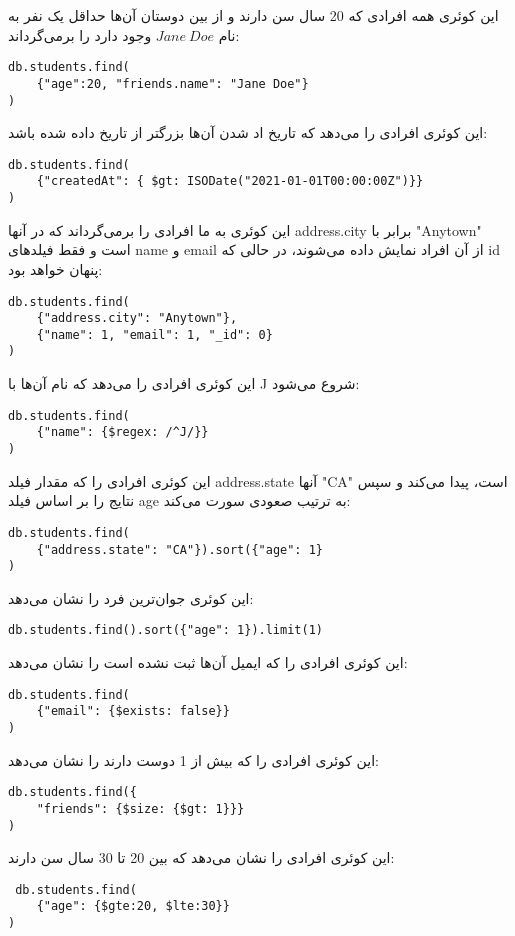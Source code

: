 این کوئری همه افرادی که 20 سال سن دارند و از بین دوستان آن‌ها حداقل یک نفر به نام $Jane \ Doe$ وجود دارد را برمی‌گرداند:
\setLTR
\begin{lstlisting}
db.students.find(
	{"age":20, "friends.name": "Jane Doe"}
)
\end{lstlisting}
\setRTL


این کوئری افرادی را می‌دهد که تاریخ اد شدن آن‌ها بزرگتر از تاریخ داده شده باشد:
\setLTR
\begin{lstlisting}
db.students.find(
	{"createdAt": { $gt: ISODate("2021-01-01T00:00:00Z")}}
)
\end{lstlisting}
\setRTL


این کوئری به ما افرادی را برمی‌گرداند که در آنها address.city برابر با "Anytown" است و فقط فیلدهای name و email از آن افراد نمایش داده می‌شوند، در حالی که id پنهان خواهد بود:
\setLTR
\begin{lstlisting}
db.students.find(
	{"address.city": "Anytown"}, 
	{"name": 1, "email": 1, "_id": 0}
)
\end{lstlisting}
\setRTL

این کوئری افرادی را می‌دهد که نام آن‌ها با J شروع می‌شود:
\setLTR
\begin{lstlisting}
db.students.find(
	{"name": {$regex: /^J/}}
)
\end{lstlisting}
\setRTL

این کوئری افرادی  را که مقدار فیلد address.state آنها "CA" است، پیدا می‌کند و سپس نتایج را بر اساس فیلد age به ترتیب صعودی سورت می‌کند:
\setLTR
\begin{lstlisting}
db.students.find(
	{"address.state": "CA"}).sort({"age": 1}
)
\end{lstlisting}
\setRTL


این کوئری جوان‌ترین فرد را نشان می‌دهد:
\setLTR
\begin{lstlisting}
db.students.find().sort({"age": 1}).limit(1)
\end{lstlisting}
\setRTL


این کوئری افرادی را که ایمیل آن‌ها ثبت نشده است را نشان می‌دهد:
\setLTR
\begin{lstlisting}
db.students.find(
	{"email": {$exists: false}}
)
\end{lstlisting}
\setRTL

این کوئری افرادی را که بیش از 1 دوست دارند را نشان می‌دهد:
\setLTR
\begin{lstlisting}
db.students.find({
	"friends": {$size: {$gt: 1}}}
)
\end{lstlisting}
\setRTL

این کوئری افرادی را نشان می‌دهد که بین 20 تا 30 سال سن دارند:
\setLTR
\begin{lstlisting}
 db.students.find(
 	{"age": {$gte:20, $lte:30}}
)
\end{lstlisting}
\setRTL
\pagebreak


